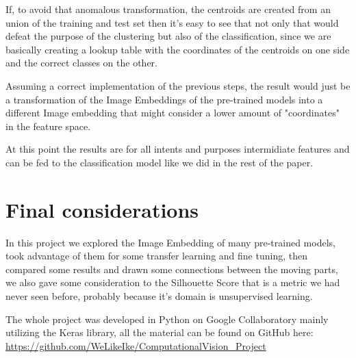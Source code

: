 \documentclass[conference]{IEEEtran}
\begin{document}
If, to avoid that anomalous transformation, the centroids are created from an union of the training and test set then it's easy to see that not only that would defeat the purpose of the clustering but also of the classification, since we are basically creating a lookup table with the coordinates of the centroids on one side and the correct classes on the other.

Assuming a correct implementation of the previous steps, the result would just be a transformation of the Image Embeddings of the pre-trained models into a different Image embedding that might consider a lower amount of "coordinates" in the feature space.

At this point the results are for all intents and purposes intermidiate features and can be fed to the classification model like we did in the rest of the paper.

\section{Final considerations}
In this project we explored the Image Embedding of many pre-trained models, took advantage of them for some transfer learning and fine tuning, then compared some results and drawn some connections between the moving parts, we also gave some consideration to the Silhouette Score that is a metric we had never seen before, probably because it's domain is unsupervised learning.

The whole project was developed in Python on Google Collaboratory mainly utilizing the Keras library, all the material can be found on GitHub here: \url{https://github.com/WeLikeIke/ComputationalVision_Project}
\end{document}
